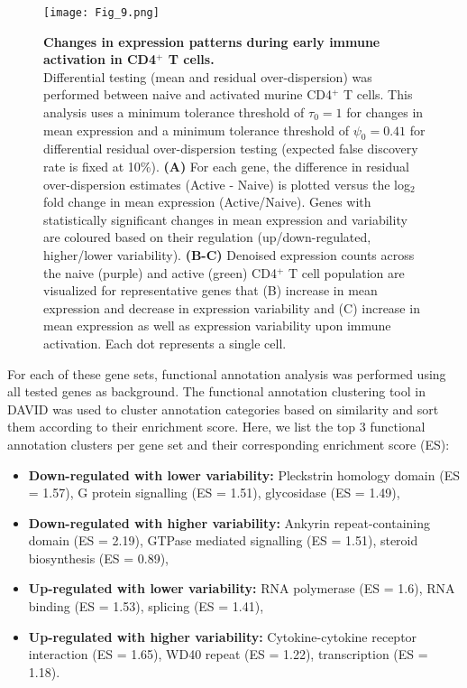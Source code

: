 \newpage

\begin{figure}[!h]
\centering
\texttt{[image: Fig\_9.png]}
\caption[Changes in expression patterns during early immune activation]{\textbf{Changes in expression patterns during early immune activation in CD4$^+$ T cells.}\\
Differential testing (mean and residual over-dispersion) was performed between naive and activated murine CD4$^+$ T cells. This analysis uses a minimum tolerance threshold of $\tau_0=1$ for changes in mean expression and a minimum tolerance threshold of $\psi_0=0.41$ for differential residual over-dispersion testing (expected false discovery rate is fixed at 10\%). \textbf{(A)} For each gene, the difference in residual over-dispersion estimates (Active - Naive) is plotted versus the log$_2$ fold change in mean expression (Active/Naive). Genes with statistically significant changes in mean expression and variability are coloured based on their regulation (up/down-regulated, higher/lower variability).  \textbf{(B-C)} Denoised expression counts across the naive (purple) and active (green) CD4$^+$ T cell population are visualized for representative genes that (B) increase in mean expression and decrease in expression variability and (C) increase in mean expression as well as expression variability  upon immune activation. Each dot represents a single cell.}
\label{fig2:immune_activation}
\end{figure}

\newpage

For each of these gene sets, functional annotation analysis was performed using all tested genes as background. The functional annotation clustering tool in DAVID \citep{Dennis2003} was used to cluster annotation categories based on similarity and sort them according to their enrichment score. Here, we  list the top 3 functional annotation clusters per gene set and their corresponding enrichment score (ES):
\begin{itemize}
\item \textbf{Down-regulated with lower variability:} Pleckstrin homology domain (ES = 1.57), G protein signalling (ES = 1.51), glycosidase (ES = 1.49),
\item \textbf{Down-regulated with higher variability:} Ankyrin repeat-containing domain (ES = 2.19), GTPase mediated signalling (ES = 1.51), steroid biosynthesis (ES = 0.89), 
\item \textbf{Up-regulated with lower variability:} RNA polymerase (ES = 1.6), RNA binding (ES = 1.53), splicing (ES = 1.41),
\item \textbf{Up-regulated with higher variability:} Cytokine-cytokine receptor interaction (ES = 1.65), WD40 repeat (ES = 1.22), transcription (ES = 1.18).
\end{itemize}

